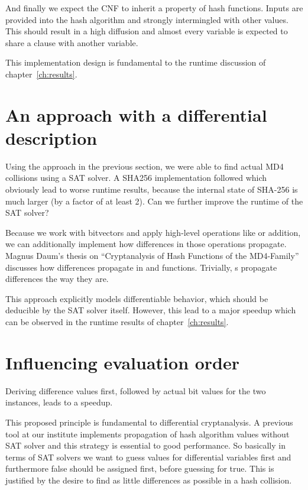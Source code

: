 And finally we expect the CNF to inherit a property of hash functions.
Inputs are provided into the hash algorithm and strongly intermingled
with other values. This should result in a high diffusion and almost every
variable is expected to share a clause with another variable.

This implementation design is fundamental to the runtime discussion of chapter~\ref{ch:results}.

\section{An approach with a differential description}
\label{sec:enc-diff-desc}
%
Using the approach in the previous section, we were able to find actual MD4 collisions
using a SAT solver. A SHA256 implementation followed which obviously lead to worse
runtime results, because the internal state of SHA-256 is much larger (by a factor
of at least 2). Can we further improve the runtime of the SAT solver?

Because we work with bitvectors and apply high-level operations like  or addition,
we can additionally implement how differences in those operations propagate.
Magnus Daum's thesis on \enquote{Cryptanalysis of Hash Functions of the
MD4-Family}~\cite[Table 4.4]{daum} discusses how differences propagate in  and
 functions. Trivially, s propagate differences the way they are.

This approach explicitly models differentiable behavior, which should be deducible
by the SAT solver itself. However, this lead to a major speedup which can be observed
in the runtime results of chapter~\ref{ch:results}.

\section{Influencing evaluation order}
\label{sec:enc-order}
%
\begin{prop}
  Deriving difference values first, followed by actual bit values for the two instances,
  leads to a speedup.
\end{prop}

This proposed principle is fundamental to differential cryptanalysis. A previous tool
at our institute implements propagation of hash algorithm values without SAT solver
and this strategy is essential to good performance. So basically in terms of SAT solvers
we want to guess values for differential variables first and furthermore false should
be assigned first, before guessing for true. This is justified by the desire to find as
little differences as possible in a hash collision.

